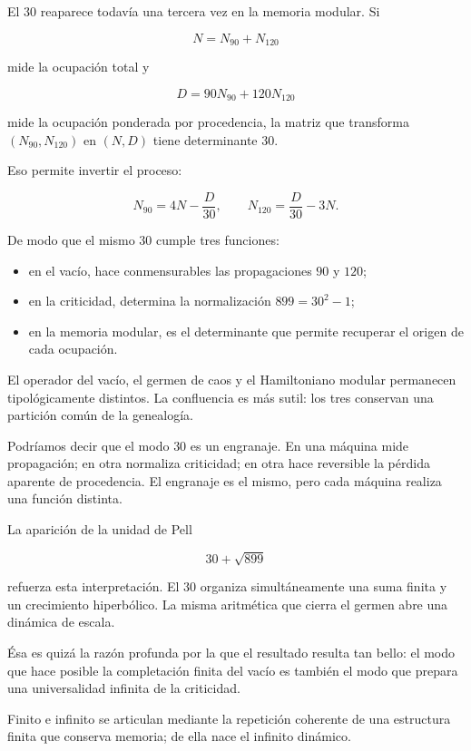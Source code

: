 El \(30\) reaparece todavía una tercera vez en la memoria modular. Si\par

\[
N=N_{90}+N_{120}
\]

mide la ocupación total y\par

\[
D=90N_{90}+120N_{120}
\]

mide la ocupación ponderada por procedencia, la matriz que transforma \((N_{90},N_{120})\) en \((N,D)\) tiene determinante \(30\).\par

Eso permite invertir el proceso:\par

\[
N_{90}=4N-\frac D{30},
\qquad
N_{120}=\frac D{30}-3N.
\]

De modo que el mismo \(30\) cumple tres funciones:\par

\begin{itemize}[leftmargin=*,itemsep=0.35em]
\item en el vacío, hace conmensurables las propagaciones \(90\) y \(120\);
\item en la criticidad, determina la normalización \(899=30^2-1\);
\item en la memoria modular, es el determinante que permite recuperar el origen de cada ocupación.
\end{itemize}

El operador del vacío, el germen de caos y el Hamiltoniano modular permanecen tipológicamente distintos. La confluencia es más sutil: los tres conservan una partición común de la genealogía.\par

Podríamos decir que el modo \(30\) es un engranaje. En una máquina mide propagación; en otra normaliza criticidad; en otra hace reversible la pérdida aparente de procedencia. El engranaje es el mismo, pero cada máquina realiza una función distinta.\par

La aparición de la unidad de Pell\par

\[
30+\sqrt{899}
\]

refuerza esta interpretación. El \(30\) organiza simultáneamente una suma finita y un crecimiento hiperbólico. La misma aritmética que cierra el germen abre una dinámica de escala.\par

Ésa es quizá la razón profunda por la que el resultado resulta tan bello: el modo que hace posible la completación finita del vacío es también el modo que prepara una universalidad infinita de la criticidad.\par

Finito e infinito se articulan mediante la repetición coherente de una estructura finita que conserva memoria; de ella nace el infinito dinámico.\par

